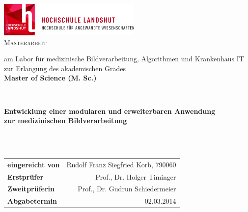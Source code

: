 \begin{titlepage}


\begin{center}



\includegraphics[angle=0,width=7cm]{./img/HL_WBM_de_B_300dpi.jpg}\\[2cm]


\textsc{\LARGE Masterarbeit}\\[0.6cm]

\small 

am Labor für medizinische Bildverarbeitung, Algorithmen und Krankenhaus IT \\[1cm]
zur Erlangung des akademischen Grades\\
\textbf{Master of Science (M. Sc.)} \\[1cm]

\normalsize

\HRule \\[0.4cm]
{
	
	\bfseries Entwicklung einer modularen und erweiterbaren Anwendung \\
	 zur medizinischen Bildverarbeitung
}\\[0.4cm]
\HRule \\[1.3cm]







\vfill

\footnotesize 

\begin{tabularx}{\textwidth}{Xr}
  \textbf{eingereicht von} 	& 	Rudolf Franz Siegfried Korb, 790060 \\ 
  \textbf{Erstprüfer} 		& 	Prof., Dr. Holger Timinger \\ 
  \textbf{Zweitprüferin} 	& 	Prof., Dr. Gudrun Schiedermeier \\ 
  \textbf{Abgabetermin}		&	02.03.2014
\end{tabularx}


\end{center}
\end{titlepage}
